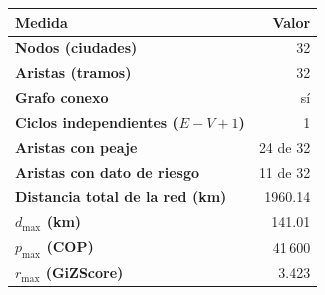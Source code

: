 \renewcommand{\arraystretch}{1.2}
\begin{tabular}{|l|r|}
\hline
\rowcolor{gray!20} \textbf{Medida} & \textbf{Valor} \\
\hline
\textbf{Nodos (ciudades)} & 32 \\
\hline
\textbf{Aristas (tramos)} & 32 \\
\hline
\textbf{Grafo conexo} & sí \\
\hline
\textbf{Ciclos independientes ($E-V+1$)} & 1 \\
\hline
\textbf{Aristas con peaje} & 24 de 32 \\
\hline
\textbf{Aristas con dato de riesgo} & 11 de 32 \\
\hline
\textbf{Distancia total de la red (km)} & 1960.14 \\
\hline
\textbf{$d_{\max}$ (km)} & 141.01 \\
\hline
\textbf{$p_{\max}$ (COP)} & 41\,600 \\
\hline
\textbf{$r_{\max}$ (GiZScore)} & 3.423 \\
\hline
\end{tabular}
